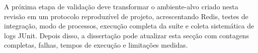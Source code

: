 A pr\'{o}xima etapa de valida\c{c}\~{a}o deve transformar o ambiente-alvo criado nesta revis\~{a}o em um protocolo reproduz\'{i}vel de projeto, acrescentando Redis, testes de integra\c{c}\~{a}o, modo de processos, execu\c{c}\~{a}o completa da su\'{i}te e coleta sistem\'{a}tica de logs JUnit. Depois disso, a disserta\c{c}\~{a}o pode atualizar esta sec\c{c}\~{a}o com contagens completas, falhas, tempos de execu\c{c}\~{a}o e limita\c{c}\~{o}es medidas.
